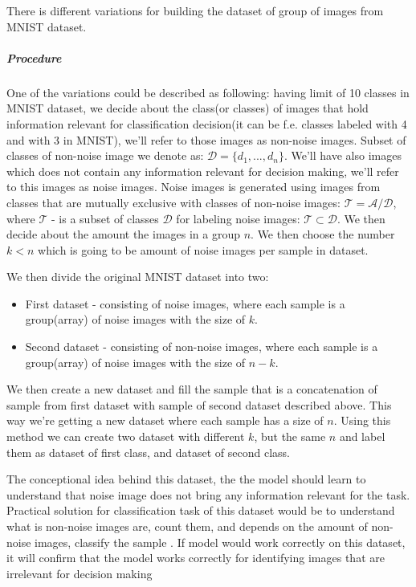 {There is different variations for building the dataset of group of images from MNIST dataset.
\subparagraph{Procedure}
One of the variations could be described as following:
having limit of 10 classes in MNIST dataset, we decide about the class(or classes) of images
that hold information relevant for classification decision(it can be f.e. classes
labeled with 4 and with 3 in MNIST),
we'll refer to those images as non-noise images. Subset of classes of non-noise image
we denote as: $\mathcal{D} = \{d_1,..., d_n\}$.
We'll have also images which does not
contain any information relevant for decision making, we'll refer to this images
as noise images. Noise images is generated using images from classes that
are mutually exclusive with classes of non-noise images:
$\mathcal{T} = \mathcal{A} / \mathcal{D}$, where $\mathcal{T}$ - is a subset of classes $\mathcal{D}$
for labeling noise images: $\mathcal{T}\subset \mathcal{D}$.
We then decide about the amount the images in a group $n$.
We then choose the number $k < n $ which is going to be amount of noise images
per sample in dataset.


We then divide the original MNIST dataset into two:
\begin{itemize}
	\item First dataset - consisting of noise images, where each sample is a group(array)
		of noise images with the size of $k$.
	\item Second dataset - consisting of non-noise images, where each sample is a group(array)
		of noise images with the size of $n-k$.
\end{itemize}

We then create a new dataset and fill the sample that is a concatenation of sample
from first dataset with sample of second dataset described above.
This way we're getting a new dataset
where each sample has a size of $n$. Using this method we can create two dataset with
different $k$, but the same $n$ and label them as dataset of first class, and
dataset of second class.

The conceptional idea behind this dataset, the the model should learn to
understand that noise image does not bring any information relevant for the task.
Practical solution for classification task of this dataset would be
to understand what is non-noise images are,
count them, and depends on the amount of non-noise images,
classify the sample
. If model would work correctly on this dataset, it will confirm
 that the model works correctly
for identifying images that are irrelevant for decision making

}
